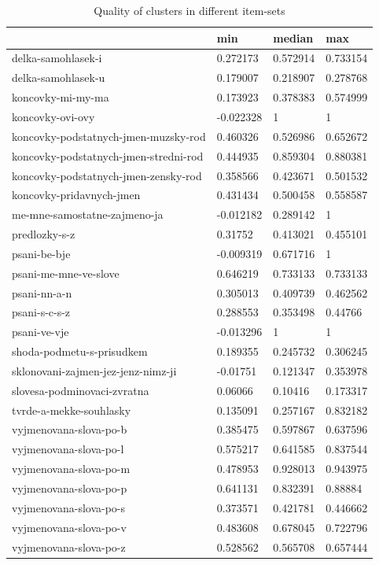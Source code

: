 \documentclass[
  digital, %
  table,   %
  nolof,     %
  nolot,     %
  nocover
]{fithesis3}
\begin{document}
\begin{table}
  \begin{tabular}{ | l | l | l | l | }
    \hline
       & min & median & max \\ \hline
      delka-samohlasek-i & 0.272173 & 0.572914 & 0.733154 \\ \hline
      delka-samohlasek-u & 0.179007 & 0.218907 & 0.278768 \\ \hline
      koncovky-mi-my-ma & 0.173923 & 0.378383 & 0.574999 \\ \hline
      koncovky-ovi-ovy & -0.022328 & 1 & 1 \\ \hline
      koncovky-podstatnych-jmen-muzsky-rod & 0.460326 & 0.526986 & 0.652672 \\ \hline
      koncovky-podstatnych-jmen-stredni-rod & 0.444935 & 0.859304 & 0.880381 \\ \hline
      koncovky-podstatnych-jmen-zensky-rod & 0.358566 & 0.423671 & 0.501532 \\ \hline
      koncovky-pridavnych-jmen & 0.431434 & 0.500458 & 0.558587 \\ \hline
      me-mne-samostatne-zajmeno-ja & -0.012182 & 0.289142 & 1 \\ \hline
      predlozky-s-z & 0.31752 & 0.413021 & 0.455101 \\ \hline
      psani-be-bje & -0.009319 & 0.671716 & 1 \\ \hline
      psani-me-mne-ve-slove & 0.646219 & 0.733133 & 0.733133 \\ \hline
      psani-nn-a-n & 0.305013 & 0.409739 & 0.462562 \\ \hline
      psani-s-c-s-z & 0.288553 & 0.353498 & 0.44766 \\ \hline
      psani-ve-vje & -0.013296 & 1 & 1 \\ \hline
      shoda-podmetu-s-prisudkem & 0.189355 & 0.245732 & 0.306245 \\ \hline
      sklonovani-zajmen-jez-jenz-nimz-ji & -0.01751 & 0.121347 & 0.353978 \\ \hline
      slovesa-podminovaci-zvratna & 0.06066 & 0.10416 & 0.173317 \\ \hline
      tvrde-a-mekke-souhlasky & 0.135091 & 0.257167 & 0.832182 \\ \hline
      vyjmenovana-slova-po-b & 0.385475 & 0.597867 & 0.637596 \\ \hline
      vyjmenovana-slova-po-l & 0.575217 & 0.641585 & 0.837544 \\ \hline
      vyjmenovana-slova-po-m & 0.478953 & 0.928013 & 0.943975 \\ \hline
      vyjmenovana-slova-po-p & 0.641131 & 0.832391 & 0.88884 \\ \hline
      vyjmenovana-slova-po-s & 0.373571 & 0.421781 & 0.446662 \\ \hline
      vyjmenovana-slova-po-v & 0.483608 & 0.678045 & 0.722796 \\ \hline
      vyjmenovana-slova-po-z & 0.528562 & 0.565708 & 0.657444 \\ \hline
  \end{tabular}
  \caption{Quality of clusters in different item-sets}
  \label{tab:quality-of-clusters}
\end{table}
\end{document}

